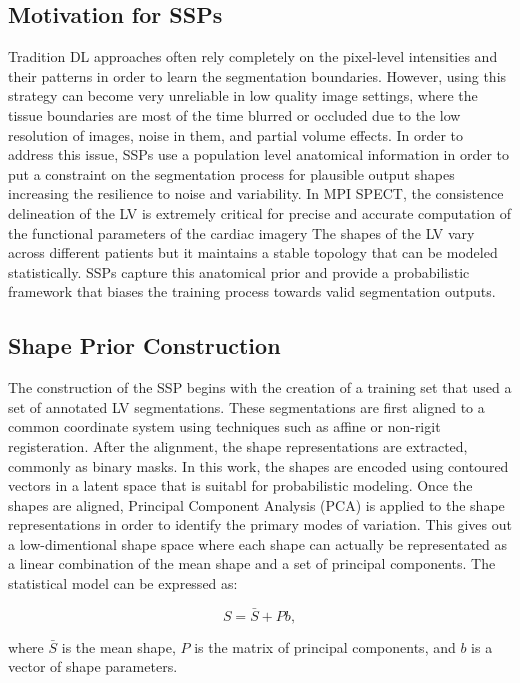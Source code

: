 \subsection{Motivation for SSPs}
Tradition DL approaches often rely completely on the pixel-level intensities and their patterns in order to learn the segmentation boundaries. However, using this strategy can become very unreliable in low quality image settings, where the tissue boundaries are most of the time blurred or occluded due to the low resolution of images, noise in them, and partial volume effects. In order to address this issue, SSPs use a population level anatomical information in order to put a constraint on the segmentation process for plausible output shapes increasing the resilience to noise and variability. In MPI SPECT, the consistence delineation of the LV is extremely critical for precise and accurate computation of the functional parameters of the cardiac imagery The shapes of the LV vary across different patients but it maintains a stable topology that can be modeled statistically. SSPs capture this anatomical prior and provide a probabilistic framework that biases the training process towards valid segmentation outputs.

\subsection{Shape Prior Construction}
The construction of the SSP begins with the creation of a training set that used a set of annotated LV segmentations. These segmentations are first aligned to a common coordinate system using techniques such as affine or non-rigit registeration. After the alignment, the shape representations are extracted, commonly as binary masks. In this work, the shapes are encoded using contoured vectors in a latent space that is suitabl for probabilistic modeling. Once the shapes are aligned, Principal Component Analysis (PCA) is applied to the shape representations in order to identify the primary modes of variation. This gives out a low-dimentional shape space where each shape can actually be representated as a linear combination of the mean shape and a set of principal components. The statistical model can be expressed as:

\begin{equation} S = \bar{S} + Pb, \end{equation} 

where $\bar{S}$ is the mean shape, $P$ is the matrix of principal components, and $b$ is a vector of shape parameters.

